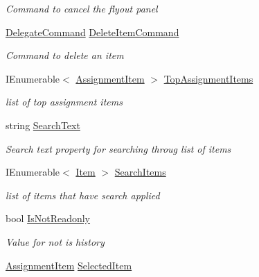 \begin{DoxyCompactItemize}
\begin{DoxyCompactList}\small\item\em Command to cancel the flyout panel \end{DoxyCompactList}\item 
\hyperlink{class_delegate_command}{Delegate\+Command} \hyperlink{class_field_service_1_1_win_r_t_1_1_view_models_1_1_item_view_model_a73505c947b8da01241226f0872812720}{Delete\+Item\+Command}
\begin{DoxyCompactList}\small\item\em Command to delete an item \end{DoxyCompactList}\item 
I\+Enumerable$<$ \hyperlink{class_field_service_1_1_data_1_1_assignment_item}{Assignment\+Item} $>$ \hyperlink{class_field_service_1_1_win_r_t_1_1_view_models_1_1_item_view_model_ab7102b2d5a560c04d60c258860604d10}{Top\+Assignment\+Items}
\begin{DoxyCompactList}\small\item\em list of top assignment items \end{DoxyCompactList}\item 
string \hyperlink{class_field_service_1_1_win_r_t_1_1_view_models_1_1_item_view_model_a7c3c506983eb0a7a8ece27ca2194d63b}{Search\+Text}
\begin{DoxyCompactList}\small\item\em Search text property for searching throug list of items \end{DoxyCompactList}\item 
I\+Enumerable$<$ \hyperlink{class_field_service_1_1_data_1_1_item}{Item} $>$ \hyperlink{class_field_service_1_1_win_r_t_1_1_view_models_1_1_item_view_model_a0851c0b3fd82030cfe85b9e707a72c2b}{Search\+Items}
\begin{DoxyCompactList}\small\item\em list of items that have search applied \end{DoxyCompactList}\item 
bool \hyperlink{class_field_service_1_1_win_r_t_1_1_view_models_1_1_item_view_model_abf02d1b69374e11165651c129d70e3af}{Is\+Not\+Readonly}
\begin{DoxyCompactList}\small\item\em Value for not is history \end{DoxyCompactList}\item 
\hyperlink{class_field_service_1_1_data_1_1_assignment_item}{Assignment\+Item} \hyperlink{class_field_service_1_1_win_r_t_1_1_view_models_1_1_item_view_model_a7e72b0d74c05b02e8b7ad134e6c93520}{Selected\+Item}
\end{DoxyCompactItemize}
